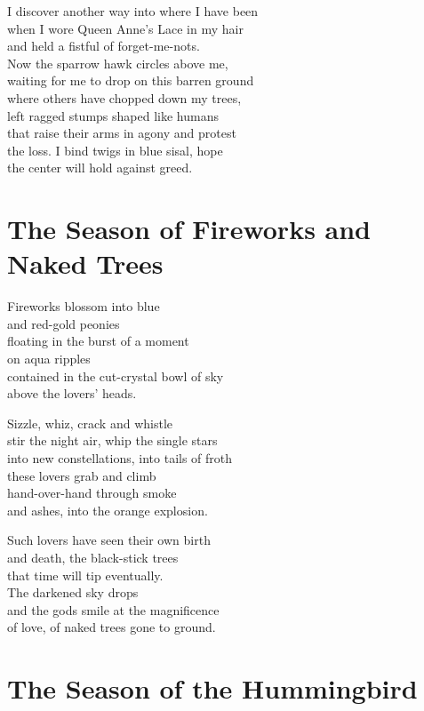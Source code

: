 \documentclass[twoside,10pt]{book}
\begin{document}
I discover another way into where I have been\\
when I wore Queen Anne's Lace in my hair\\
and held a fistful of forget-me-nots.\\
Now the sparrow hawk circles above me,\\
waiting for me to drop on this barren ground\\
where others have chopped down my trees,\\
left ragged stumps shaped like humans\\
that raise their arms in agony and protest\\
the loss. I bind twigs in blue sisal, hope\\
the center will hold against greed.


\clearpage
\section{The Season of Fireworks and Naked Trees}

Fireworks blossom into blue\\
and red-gold peonies\\
floating in the burst of a moment\\
on aqua ripples\\
contained in the cut-crystal bowl of sky\\
above the lovers' heads.

Sizzle, whiz, crack and whistle\\
stir the night air, whip the single stars\\
into new constellations, into tails of froth\\
these lovers grab and climb\\
hand-over-hand through smoke\\
and ashes, into the orange explosion.

Such lovers have seen their own birth\\
and death, the black-stick trees\\
that time will tip eventually.\\
The darkened sky drops\\
and the gods smile at the magnificence\\
of love, of naked trees gone to ground.


\clearpage
\section{The Season of the Hummingbird}
\end{document}
